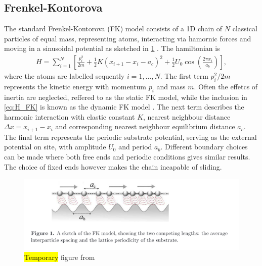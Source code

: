 
\subsection{Frenkel-Kontorova}

The standard Frenkel-Kontorova (\acrshort{FK}) model consists of a 1D chain of $N$ classical
particles of equal mass, representing atoms, interacting via hamornic forces and moving in a sinusoidal potential as sketched in \cref{fig:FK_model} \cite{Manini_2016}. The hamiltonian is 
\begin{align}
  H = \sum_{i=1}^N \left[\frac{p_i^2}{2m} + \frac{1}{2}K(x_{i+1} - x_i - a_c)^2 + \frac{1}{2}U_0 \cos{\left(\frac{2\pi x_i}{a_b}\right)}\right],
  \label{eq:H_FK}
\end{align}
where the atoms are labelled sequently $i = 1, \hdots, N$. The first term $p_i^2/2m$ represents the kinetic energy with momentum $p_i$
and mass $m$. Often the effetcs of inertia are neglected, reffered to as the static \acrshort{FK} model, while the inclusion in \cref{eq:H_FK} is known as the dynamic \acrshort{FK} model \cite{FK2D}. The next term describes the harmonic interaction with elastic
constant $K$, nearest neighbour distance $\Delta x = x_{i+1} - x_i$ and 
corresponding nearest neighbour equilibrium distance $a_c$. The final term represents the periodic substrate potential, serving as the external potential on site, with amplitude $U_0$ and period $a_b$. Different boundary choices can be made where both free ends and periodic conditions gives similar results. The choice of fixed ends however makes the chain incapable of sliding.

\begin{figure}[H]
  \centering
  \includegraphics[width=0.8\linewidth]{figures/theory/FK_model.png}
  \caption{\hl{Temporary} figure from \cite{Manini_2016}}
  \label{fig:FK_model}
\end{figure}


